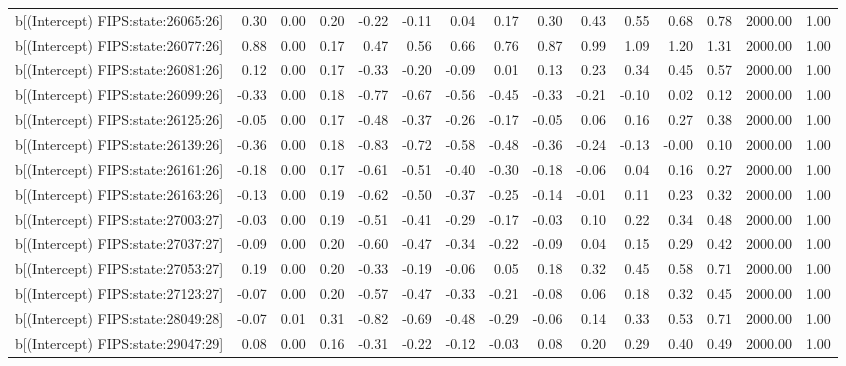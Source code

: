 \begin{table}[ht]
\begin{tabular}{rrrrrrrrrrrrrrr}
  b[(Intercept) FIPS:state:26065:26] & 0.30 & 0.00 & 0.20 & -0.22 & -0.11 & 0.04 & 0.17 & 0.30 & 0.43 & 0.55 & 0.68 & 0.78 & 2000.00 & 1.00 \\ 
  b[(Intercept) FIPS:state:26077:26] & 0.88 & 0.00 & 0.17 & 0.47 & 0.56 & 0.66 & 0.76 & 0.87 & 0.99 & 1.09 & 1.20 & 1.31 & 2000.00 & 1.00 \\ 
  b[(Intercept) FIPS:state:26081:26] & 0.12 & 0.00 & 0.17 & -0.33 & -0.20 & -0.09 & 0.01 & 0.13 & 0.23 & 0.34 & 0.45 & 0.57 & 2000.00 & 1.00 \\ 
  b[(Intercept) FIPS:state:26099:26] & -0.33 & 0.00 & 0.18 & -0.77 & -0.67 & -0.56 & -0.45 & -0.33 & -0.21 & -0.10 & 0.02 & 0.12 & 2000.00 & 1.00 \\ 
  b[(Intercept) FIPS:state:26125:26] & -0.05 & 0.00 & 0.17 & -0.48 & -0.37 & -0.26 & -0.17 & -0.05 & 0.06 & 0.16 & 0.27 & 0.38 & 2000.00 & 1.00 \\ 
  b[(Intercept) FIPS:state:26139:26] & -0.36 & 0.00 & 0.18 & -0.83 & -0.72 & -0.58 & -0.48 & -0.36 & -0.24 & -0.13 & -0.00 & 0.10 & 2000.00 & 1.00 \\ 
  b[(Intercept) FIPS:state:26161:26] & -0.18 & 0.00 & 0.17 & -0.61 & -0.51 & -0.40 & -0.30 & -0.18 & -0.06 & 0.04 & 0.16 & 0.27 & 2000.00 & 1.00 \\ 
  b[(Intercept) FIPS:state:26163:26] & -0.13 & 0.00 & 0.19 & -0.62 & -0.50 & -0.37 & -0.25 & -0.14 & -0.01 & 0.11 & 0.23 & 0.32 & 2000.00 & 1.00 \\ 
  b[(Intercept) FIPS:state:27003:27] & -0.03 & 0.00 & 0.19 & -0.51 & -0.41 & -0.29 & -0.17 & -0.03 & 0.10 & 0.22 & 0.34 & 0.48 & 2000.00 & 1.00 \\ 
  b[(Intercept) FIPS:state:27037:27] & -0.09 & 0.00 & 0.20 & -0.60 & -0.47 & -0.34 & -0.22 & -0.09 & 0.04 & 0.15 & 0.29 & 0.42 & 2000.00 & 1.00 \\ 
  b[(Intercept) FIPS:state:27053:27] & 0.19 & 0.00 & 0.20 & -0.33 & -0.19 & -0.06 & 0.05 & 0.18 & 0.32 & 0.45 & 0.58 & 0.71 & 2000.00 & 1.00 \\ 
  b[(Intercept) FIPS:state:27123:27] & -0.07 & 0.00 & 0.20 & -0.57 & -0.47 & -0.33 & -0.21 & -0.08 & 0.06 & 0.18 & 0.32 & 0.45 & 2000.00 & 1.00 \\ 
  b[(Intercept) FIPS:state:28049:28] & -0.07 & 0.01 & 0.31 & -0.82 & -0.69 & -0.48 & -0.29 & -0.06 & 0.14 & 0.33 & 0.53 & 0.71 & 2000.00 & 1.00 \\ 
  b[(Intercept) FIPS:state:29047:29] & 0.08 & 0.00 & 0.16 & -0.31 & -0.22 & -0.12 & -0.03 & 0.08 & 0.20 & 0.29 & 0.40 & 0.49 & 2000.00 & 1.00 \\ 

\end{tabular}
\end{table}
